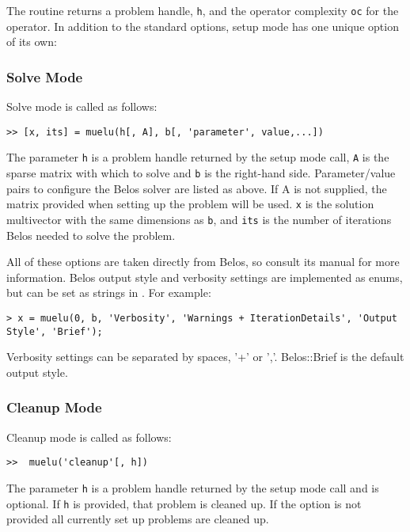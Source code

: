 The routine returns a problem handle, \texttt{h}, and the operator
complexity \texttt{oc} for the operator.  In addition to the standard
options, setup mode has one unique option of its own:


\subsubsection{Solve Mode}
Solve mode is called as follows:
\begin{verbatim}
>> [x, its] = muelu(h[, A], b[, 'parameter', value,...])
\end{verbatim}
The parameter \texttt{h} is a problem handle returned by the
setup mode call, \texttt{A} is the sparse matrix with which to
solve and \texttt{b} is the right-hand side.  Parameter/value pairs
to configure the Belos solver are listed as above. If A is not supplied,
the matrix provided when setting up the problem will be used. \texttt{x} is
the solution multivector with the same dimensions as \texttt{b}, and \texttt{its}
is the number of iterations Belos needed to solve the problem.

All of these options are taken directly from Belos, so consult its
manual for more information. Belos output style and verbosity settings
are implemented as enums, but can be set as strings in \muemex. For example:

\begin{verbatim}
> x = muelu(0, b, 'Verbosity', 'Warnings + IterationDetails', 'Output Style', 'Brief');
\end{verbatim}

Verbosity settings can be separated by spaces, '+' or ','. Belos::Brief
is the default output style.

\subsubsection{Cleanup Mode}
Cleanup mode is called as follows:
\begin{verbatim}
>>  muelu('cleanup'[, h])
\end{verbatim}
The parameter \texttt{h} is a problem handle returned by the
setup mode call and is optional.  If \texttt{h} is provided, that
problem is cleaned up.  If the option is not provided all currently
set up problems are cleaned up.

